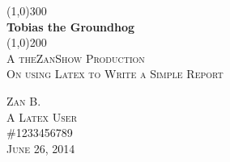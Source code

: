 \documentclass{article}
\begin{document}
\begin{titlepage}
	\begin{center}
	\line(1,0){300} \\
	[0.25in]
	\huge{\bfseries Tobias the Groundhog}\\
	[2mm]
	\line(1,0){200} \\
	[1.5cm]
	\textsc {\LARGE A theZanShow Production}\\
	[0.75cm]
	\textsc{\Large On using Latex to Write a Simple Report} \\
	[9cm]
	\end{center}
	\begin{flushright}
	\textsc{\large Zan B. \\
	A Latex User \\
	\#1233456789\\
	June 26, 2014\\}
	\end{flushright}
	
\end{titlepage}
\end{document}
